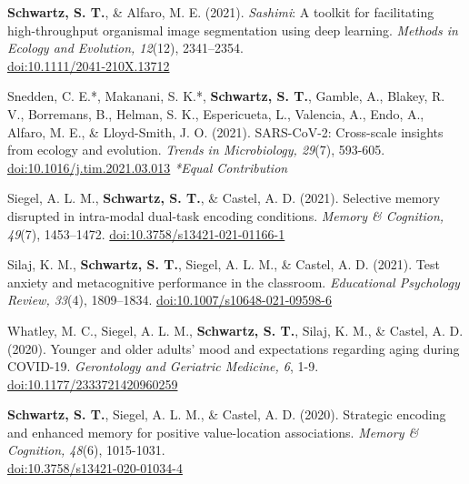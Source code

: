 \pubspace

\textbf{Schwartz, S. T.}, \& Alfaro, M. E. (2021). \textit{Sashimi}: A toolkit for facilitating high-throughput organismal image segmentation using deep learning. \textit{Methods in Ecology and Evolution, 12}(12), 2341–2354.\\ \textcolor{RoyalBlue}{\href{https://doi.org/10.1111/2041-210X.13712}{doi:10.1111/2041-210X.13712}}

\pubspace

Snedden, C. E.*, Makanani, S. K.*, \textbf{Schwartz, S. T.}, Gamble, A., Blakey, R. V., Borremans, B., Helman, S. K., Espericueta, L., Valencia, A., Endo, A., Alfaro, M. E., \& Lloyd-Smith, J. O. (2021). SARS-CoV-2: Cross-scale insights from ecology and evolution. \textit{Trends in Microbiology, 29}(7), 593-605.\\
\textcolor{RoyalBlue}{\href{https://doi.org/10.1016/j.tim.2021.03.013}{doi:10.1016/j.tim.2021.03.013}} \textit{*Equal Contribution}

\pubspace

Siegel, A. L. M., \textbf{Schwartz, S. T.}, \& Castel, A. D. (2021). Selective memory disrupted in intra-modal dual-task encoding conditions. \textit{Memory \& Cognition, 49}(7), 1453–1472. \textcolor{RoyalBlue}{\href{https://doi.org/10.3758/s13421-021-01166-1}{doi:10.3758/s13421-021-01166-1}}

\pubspace

Silaj, K. M., \textbf{Schwartz, S. T.}, Siegel, A. L. M., \& Castel, A. D. (2021). Test anxiety and metacognitive performance in the classroom. \textit{Educational Psychology Review, 33}(4), 1809–1834. \textcolor{RoyalBlue}{\href{https://doi.org/10.1007/s10648-021-09598-6}{doi:10.1007/s10648-021-09598-6}}

\pubspace

Whatley, M. C., Siegel, A. L. M., \textbf{Schwartz, S. T.}, Silaj, K. M., \& Castel, A. D. (2020). Younger and older adults' mood and expectations regarding aging during COVID-19. \textit{Gerontology and Geriatric Medicine, 6}, 1-9. \textcolor{RoyalBlue}{\href{https://doi.org/10.1177/2333721420960259}{doi:10.1177/2333721420960259}}

\newpage

\textbf{Schwartz, S. T.}, Siegel, A. L. M., \& Castel, A. D. (2020). Strategic encoding and enhanced memory for positive value-location associations. \textit{Memory \& Cognition, 48}(6), 1015-1031. \\ \textcolor{RoyalBlue}{\href{https://doi.org/10.3758/s13421-020-01034-4}{doi:10.3758/s13421-020-01034-4}}

